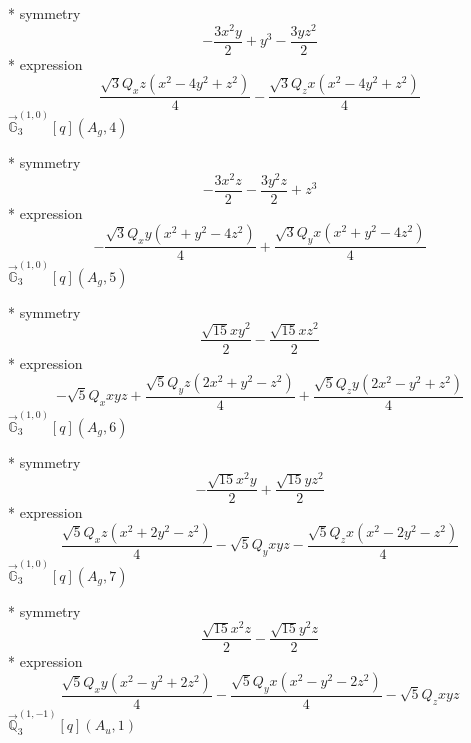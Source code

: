 \documentclass[fleqn,8pt]{jsarticle}
\begin{document}
\noindent\quad ** symmetry
\begin{dmath*}
- \frac{3 x^{2} y}{2} + y^{3} - \frac{3 y z^{2}}{2}
\end{dmath*}
\noindent\quad ** expression
\begin{dmath*}
\frac{\sqrt{3} Q_{x} z \left(x^{2} - 4 y^{2} + z^{2}\right)}{4} - \frac{\sqrt{3} Q_{z} x \left(x^{2} - 4 y^{2} + z^{2}\right)}{4}
\end{dmath*}
\noindent\quad $\vec{\mathbb{G}}_{3}^{(1,0)}[q](A_{g},4)$

\noindent\quad ** symmetry
\begin{dmath*}
- \frac{3 x^{2} z}{2} - \frac{3 y^{2} z}{2} + z^{3}
\end{dmath*}
\noindent\quad ** expression
\begin{dmath*}
- \frac{\sqrt{3} Q_{x} y \left(x^{2} + y^{2} - 4 z^{2}\right)}{4} + \frac{\sqrt{3} Q_{y} x \left(x^{2} + y^{2} - 4 z^{2}\right)}{4}
\end{dmath*}
\noindent\quad $\vec{\mathbb{G}}_{3}^{(1,0)}[q](A_{g},5)$

\noindent\quad ** symmetry
\begin{dmath*}
\frac{\sqrt{15} x y^{2}}{2} - \frac{\sqrt{15} x z^{2}}{2}
\end{dmath*}
\noindent\quad ** expression
\begin{dmath*}
- \sqrt{5} Q_{x} x y z + \frac{\sqrt{5} Q_{y} z \left(2 x^{2} + y^{2} - z^{2}\right)}{4} + \frac{\sqrt{5} Q_{z} y \left(2 x^{2} - y^{2} + z^{2}\right)}{4}
\end{dmath*}
\noindent\quad $\vec{\mathbb{G}}_{3}^{(1,0)}[q](A_{g},6)$

\noindent\quad ** symmetry
\begin{dmath*}
- \frac{\sqrt{15} x^{2} y}{2} + \frac{\sqrt{15} y z^{2}}{2}
\end{dmath*}
\noindent\quad ** expression
\begin{dmath*}
\frac{\sqrt{5} Q_{x} z \left(x^{2} + 2 y^{2} - z^{2}\right)}{4} - \sqrt{5} Q_{y} x y z - \frac{\sqrt{5} Q_{z} x \left(x^{2} - 2 y^{2} - z^{2}\right)}{4}
\end{dmath*}
\noindent\quad $\vec{\mathbb{G}}_{3}^{(1,0)}[q](A_{g},7)$

\noindent\quad ** symmetry
\begin{dmath*}
\frac{\sqrt{15} x^{2} z}{2} - \frac{\sqrt{15} y^{2} z}{2}
\end{dmath*}
\noindent\quad ** expression
\begin{dmath*}
\frac{\sqrt{5} Q_{x} y \left(x^{2} - y^{2} + 2 z^{2}\right)}{4} - \frac{\sqrt{5} Q_{y} x \left(x^{2} - y^{2} - 2 z^{2}\right)}{4} - \sqrt{5} Q_{z} x y z
\end{dmath*}
\noindent\quad $\vec{\mathbb{Q}}_{3}^{(1,-1)}[q](A_{u},1)$
\end{document}
